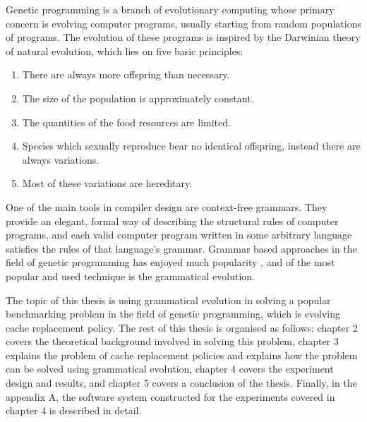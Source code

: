 Genetic programming is a branch of evolutionary computing whose primary concern is evolving computer programs, usually starting from random populations of programs. The evolution of these programs is inspired by the Darwinian theory of natural evolution, which lies on five basic principles\citep{cupic2019evolucijskoracunarstvo}:

\begin{enumerate}
	\item There are always more offspring than necessary.
	\item The size of the population is approximately constant.
	\item The quantities of the food resources are limited.
	\item Species which sexually reproduce bear no identical offspring, instead there are always variations.
	\item Most of these variations are hereditary.
\end{enumerate}

One of the main tools in compiler design are context-free grammars. They provide an elegant, formal way of describing the structural rules of computer programs, and each valid computer program written in some arbitrary language satisfies the rules of that language's grammar. Grammar based approaches in the field of genetic programming has enjoyed much popularity \citep{neill2003grammaticalevolution}, and of the most popular and used technique is the grammatical evolution.

The topic of this thesis is using grammatical evolution in solving a popular benchmarking problem in the field of genetic programming, which is evolving cache replacement policy. The rest of this thesis is organised as follows: chapter 2 covers the theoretical background involved in solving this problem, chapter 3 explains the problem of cache replacement policies and explains how the problem can be solved using grammatical evolution, chapter 4 covers the experiment design and results, and chapter 5 covers a conclusion of the thesis. Finally, in the appendix A, the software system constructed for the experiments covered in chapter 4 is described in detail.